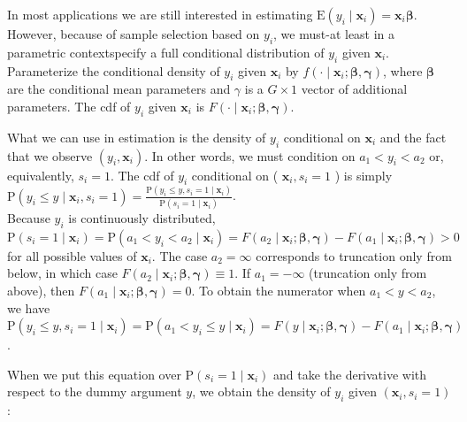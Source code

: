 \documentclass[10pt]{article}
\begin{document}
In most applications we are still interested in estimating $\mathrm{E}\left(y_{i} \mid \mathbf{x}_{i}\right)=\mathbf{x}_{i} \boldsymbol{\beta}$. However, because of sample selection based on $y_{i}$, we must-at least in a parametric contextspecify a full conditional distribution of $y_{i}$ given $\mathbf{x}_{i}$. Parameterize the conditional density of $y_{i}$ given $\mathbf{x}_{i}$ by $f\left(\cdot \mid \mathbf{x}_{i} ; \boldsymbol{\beta}, \boldsymbol{\gamma}\right)$, where $\boldsymbol{\beta}$ are the conditional mean parameters and $\gamma$ is a $G \times 1$ vector of additional parameters. The cdf of $y_{i}$ given $\mathbf{x}_{i}$ is $F\left(\cdot \mid \mathbf{x}_{i} ; \boldsymbol{\beta}, \boldsymbol{\gamma}\right)$.

What we can use in estimation is the density of $y_{i}$ conditional on $\mathbf{x}_{i}$ and the fact that we observe $\left(y_{i}, \mathbf{x}_{i}\right)$. In other words, we must condition on $a_{1}<y_{i}<a_{2}$ or, equivalently, $s_{i}=1$. The cdf of $y_{i}$ conditional on ( $\mathbf{x}_{i}, s_{i}=1$ ) is simply\\
$\mathrm{P}\left(y_{i} \leq y \mid \mathbf{x}_{i}, s_{i}=1\right)=\frac{\mathrm{P}\left(y_{i} \leq y, s_{i}=1 \mid \mathbf{x}_{i}\right)}{\mathrm{P}\left(s_{i}=1 \mid \mathbf{x}_{i}\right)}$.\\
Because $y_{i}$ is continuously distributed, $\mathrm{P}\left(s_{i}=1 \mid \mathbf{x}_{i}\right)=\mathrm{P}\left(a_{1}<y_{i}<a_{2} \mid \mathbf{x}_{i}\right)=F\left(a_{2} \mid \mathbf{x}_{i} ; \boldsymbol{\beta}, \boldsymbol{\gamma}\right) -F\left(a_{1} \mid \mathbf{x}_{i} ; \boldsymbol{\beta}, \boldsymbol{\gamma}\right)>0$ for all possible values of $\mathbf{x}_{i}$. The case $a_{2}=\infty$ corresponds to truncation only from below, in which case $F\left(a_{2} \mid \mathbf{x}_{i} ; \boldsymbol{\beta}, \boldsymbol{\gamma}\right) \equiv 1$. If $a_{1}=-\infty$ (truncation only from above), then $F\left(a_{1} \mid \mathbf{x}_{i} ; \boldsymbol{\beta}, \boldsymbol{\gamma}\right)=0$. To obtain the numerator when $a_{1}<y< a_{2}$, we have\\
$\mathrm{P}\left(y_{i} \leq y, s_{i}=1 \mid \mathbf{x}_{i}\right)=\mathrm{P}\left(a_{1}<y_{i} \leq y \mid \mathbf{x}_{i}\right)=F\left(y \mid \mathbf{x}_{i} ; \boldsymbol{\beta}, \boldsymbol{\gamma}\right)-F\left(a_{1} \mid \mathbf{x}_{i} ; \boldsymbol{\beta}, \boldsymbol{\gamma}\right)$.

When we put this equation over $\mathrm{P}\left(s_{i}=1 \mid \mathbf{x}_{i}\right)$ and take the derivative with respect to the dummy argument $y$, we obtain the density of $y_{i}$ given $\left(\mathbf{x}_{i}, s_{i}=1\right)$ :
\end{document}
